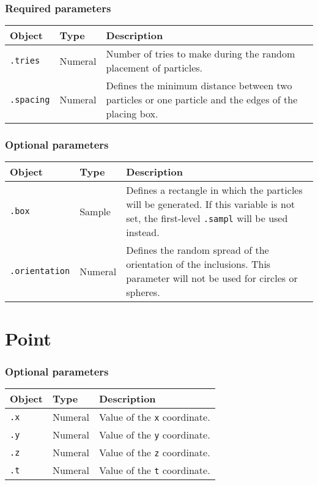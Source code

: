 \documentclass[10pt]{article}
\begin{document}
\subsubsection*{Required parameters}

\begin{tabularx}{\textwidth}{llX}
\hline 
Object & Type & Description \\ 
\hline 
\verb+.tries+ & Numeral & Number of tries to make during the random placement of particles. \\ 
\verb+.spacing+ & Numeral & Defines the minimum distance between two particles or one particle and the edges of the placing box. \\ 
\hline 
\end{tabularx}

\subsubsection*{Optional parameters}

\begin{tabularx}{\textwidth}{llX}
\hline 
Object & Type & Description \\ 
\hline 
\verb+.box+ & Sample & Defines a rectangle in which the particles will be generated. If this variable is not set, the first-level \verb+.sampl+ will be used instead. \\ 
\verb+.orientation+ & Numeral & Defines the random spread of the orientation of the inclusions. This parameter will not be used for circles or spheres. \\ 
\hline 
\end{tabularx}

\section{Point}

\subsubsection*{Optional parameters}

\begin{tabularx}{\textwidth}{llX}
\hline 
Object & Type & Description \\ 
\hline 
\verb+.x+ & Numeral & Value of the \verb+x+ coordinate.\\ 
\verb+.y+ & Numeral & Value of the \verb+y+ coordinate.\\ 
\verb+.z+ & Numeral & Value of the \verb+z+ coordinate.\\ 
\verb+.t+ & Numeral & Value of the \verb+t+ coordinate.\\ 
\hline 
\end{tabularx}
\end{document}
